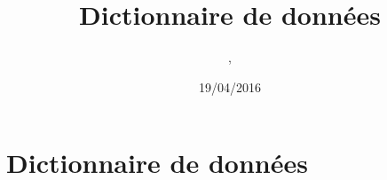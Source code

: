 \documentclass[asi, sansVersion]{picInsa}
\begin{document}
\title{Dictionnaire de données}
\author{\Mathieu, \Julie}
\date{19/04/2016} 

\maketitle

\tableofcontents

\chapter{Dictionnaire de données}

\end{document}
